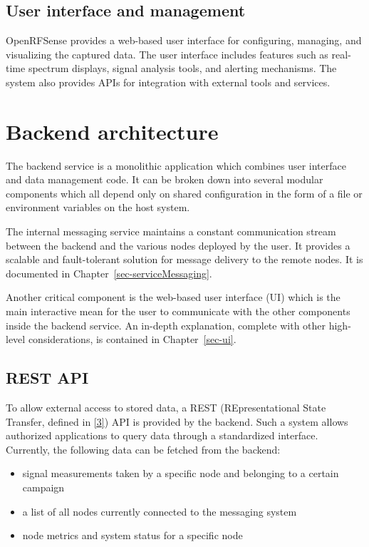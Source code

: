 \documentclass[
  letterpaper,
  a4paper,
  12pt,
  titlepage,
  oneside,
  openany]{book}
\providecommand{\tightlist}{%
  \setlength{\itemsep}{0pt}\setlength{\parskip}{0pt}}\usepackage{longtable,booktabs,array}
\begin{document}
\hypertarget{user-interface-and-management}{%
\subsection{User interface and
management}\label{user-interface-and-management}}

OpenRFSense provides a web-based user interface for configuring,
managing, and visualizing the captured data. The user interface includes
features such as real-time spectrum displays, signal analysis tools, and
alerting mechanisms. The system also provides APIs for integration with
external tools and services.

\hypertarget{backend-architecture}{%
\section{Backend architecture}\label{backend-architecture}}

The backend service is a monolithic application which combines user
interface and data management code. It can be broken down into several
modular components which all depend only on shared configuration in the
form of a file or environment variables on the host system.

The internal messaging service maintains a constant communication stream
between the backend and the various nodes deployed by the user. It
provides a scalable and fault-tolerant solution for message delivery to
the remote nodes. It is documented in
Chapter~\ref{sec-serviceMessaging}.

Another critical component is the web-based user interface (UI) which is
the main interactive mean for the user to communicate with the other
components inside the backend service. An in-depth explanation, complete
with other high-level considerations, is contained in
Chapter~\ref{sec-ui}.

\hypertarget{sec-restApi}{%
\subsection{REST API}\label{sec-restApi}}

To allow external access to stored data, a REST (REpresentational State
Transfer, defined in \protect\hyperlink{ref-fieldingArch2000}{{[}3{]}})
API is provided by the backend. Such a system allows authorized
applications to query data through a standardized interface. Currently,
the following data can be fetched from the backend:

\begin{itemize}
\tightlist
\item
  signal measurements taken by a specific node and belonging to a
  certain campaign
\item
  a list of all nodes currently connected to the messaging system
\item
  node metrics and system status for a specific node
\end{itemize}
\end{document}
